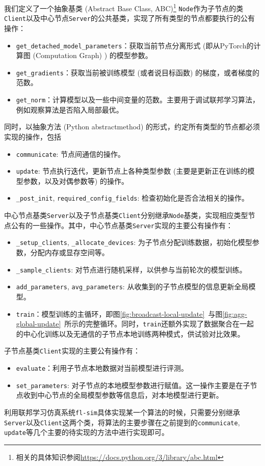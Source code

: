 我们定义了一个抽象基类 (Abstract Base Class, ABC)\footnote{相关的具体知识参阅\url{https://docs.python.org/3/library/abc.html}} \texttt{Node}作为子节点的类\texttt{Client}以及中心节点\texttt{Server}的公共基类，实现了所有类型的节点都要执行的公有操作：
\begin{itemize}
    \item \texttt{get\_detached\_model\_parameters}：获取当前节点分离形式 (即从PyTorch的计算图 (Computation Graph) ) 的模型参数。
    \item \texttt{get\_gradients}：获取当前被训练模型 (或者说目标函数) 的梯度，或者梯度的范数。
    \item \texttt{get\_norm}：计算模型以及一些中间变量的范数。主要用于调试联邦学习算法，例如观察算法是否陷入局部最优。
\end{itemize}
同时，以抽象方法 (Python abstractmethod) 的形式，约定所有类型的节点都必须实现的操作，包括
\begin{itemize}
    \item \texttt{communicate}: 节点间通信的操作。
    \item \texttt{update}: 节点执行迭代，更新节点上各种类型参数 (主要是更新正在训练的模型参数，以及对偶参数等) 的操作。
    \item \texttt{\_post\_init}, \texttt{required\_config\_fields}: 检查初始化是否合法相关的操作。
\end{itemize}

中心节点基类\texttt{Server}以及子节点基类\texttt{Client}分别继承\texttt{Node}基类，实现相应类型节点公有的一些操作。其中，中心节点基类\texttt{Server}实现的主要公有操作有：
\begin{itemize}
    \item \texttt{\_setup\_clients}, \texttt{\_allocate\_devices}: 为子节点分配训练数据，初始化模型参数，分配内存或显存空间等。
    \item \texttt{\_sample\_clients}: 对节点进行随机采样，以供参与当前轮次的模型训练。
    \item \texttt{add\_parameters}, \texttt{avg\_parameters}: 从收集到的子节点模型的信息更新全局模型。
    \item \texttt{train}：模型训练的主循环，即图\ref{fig:broadcast-local-update}~与图\ref{fig:agg-global-update}~所示的完整循环。同时，\texttt{train}还额外实现了数据聚合在一起的中心化训练以及无通信的子节点本地训练两种模式，供试验对比效果。
\end{itemize}
子节点基类\texttt{Client}实现的主要公有操作有：
\begin{itemize}
    \item \texttt{evaluate}：利用子节点本地数据对当前模型进行评测。
    \item \texttt{set\_parameters}: 对子节点的本地模型参数进行赋值。这一操作主要是在子节点收到中心节点的全局模型参数等信息后，对本地模型进行更新。
\end{itemize}
利用联邦学习仿真系统\texttt{fl-sim}具体实现某一个算法的时候，只需要分别继承\texttt{Server}以及\texttt{Client}这两个类，将算法的主要步骤在之前提到的\texttt{communicate}, \texttt{update}等几个主要的待实现的方法中进行实现即可。

